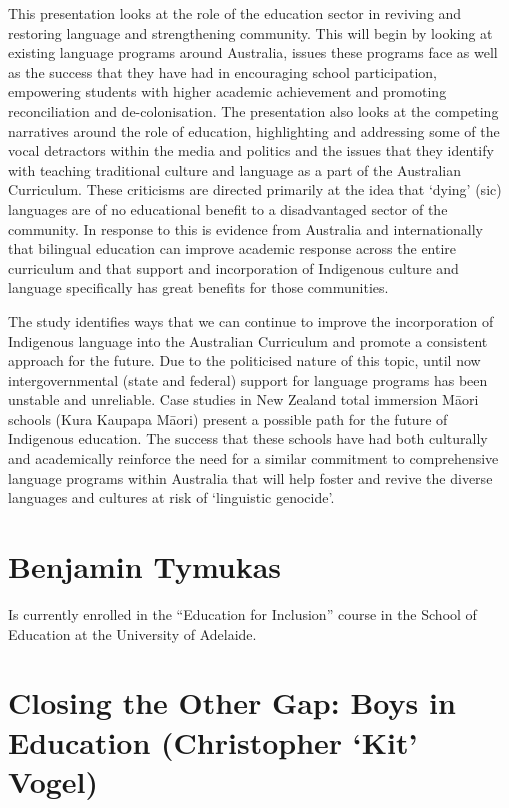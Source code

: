 \documentclass[twoside,14pt,a4paper,notitlepage]{memoir}
\begin{document}
This presentation looks at the role of the education sector in reviving and restoring language and strengthening community. This will begin by looking at existing language programs around Australia, issues these programs face as well as the success that they have had in encouraging school participation, empowering students with higher academic achievement and promoting reconciliation and de-colonisation. The presentation also looks at the competing narratives around the role of education, highlighting and addressing some of the vocal detractors within the media and politics and the issues that they identify with teaching traditional culture and language as a part of the Australian Curriculum. These criticisms are directed primarily at the idea that ‘dying’ (sic) languages are of no educational benefit to a disadvantaged sector of the community. In response to this is evidence from Australia and internationally that bilingual education can improve academic response across the entire curriculum and that support and incorporation of Indigenous culture and language specifically has great benefits for those communities.
 
The study identifies ways that we can continue to improve the incorporation of Indigenous language into the Australian Curriculum and promote a consistent approach for the future. Due to the politicised nature of this topic, until now intergovernmental (state and federal) support for language programs has been unstable and unreliable. Case studies in New Zealand total immersion Māori schools (Kura Kaupapa Māori) present a possible path for the future of Indigenous education. The success that these schools have had both culturally and academically reinforce the need for a similar commitment to comprehensive language programs within Australia that will help foster and revive the diverse languages and cultures at risk of ‘linguistic genocide’.

\section*{Benjamin Tymukas}

Is currently enrolled in the ``Education for Inclusion'' course in the School of Education at the University of Adelaide.



\section*{Closing the Other Gap: Boys in Education (Christopher `Kit' Vogel)}
\label{aut:vogel}
\end{document}
